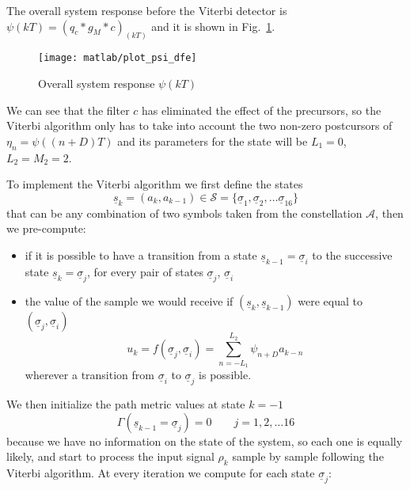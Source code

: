 \documentclass[a4paper,oneside]{article}
\renewcommand{\vec}[1]{\underline{#1}}
\newcommand{\vsigma}[0]{\vec{\sigma}}
\begin{document}
The overall system response before the Viterbi detector is $\psi(kT) =
(q_c * g_M * c)_{(kT)}$ and it is shown in Fig.~\ref{plot:psi_dfe}.
\begin{figure}[htbp]
  \centering
  \texttt{[image: matlab/plot\_psi\_dfe]}
  \caption{Overall system response $\psi(kT)$}
  \label{plot:psi_dfe}
\end{figure}
We can see that the filter $c$ has eliminated the effect of the
precursors, so the Viterbi algorithm only has to take into account the
two non-zero postcursors of $\eta_n = \psi((n+D)T)$ and its parameters
for the state will be $L_1 = 0$, $L_2 = M_2 = 2$.

To implement the Viterbi algorithm we first define the states
\begin{equation}
  \vec{s}_k = (a_k,a_{k-1}) \in \mathcal{S} = \{ \vec{\sigma}_1, \vec{\sigma}_2, \dots \vec{\sigma}_{16} \}
\end{equation}
that can be any combination of two symbols taken from the
constellation $\mathcal{A}$, then we pre-compute:
\begin{itemize}
  \item if it is possible to have a transition from a state
    $\vec{s}_{k-1} = \vec{\sigma}_i$ to the successive state
    $\vec{s}_{k} = \vec{\sigma}_j$, for every pair of states
    $\vec{\sigma}_j$, $\vec{\sigma}_i$    
\item the value of the sample we would receive if
  $(\vec{s}_k,\vec{s}_{k-1})$ were equal to $(\vsigma_j, \vsigma_i)$
  \begin{equation}
    u_k = f(\vec{\sigma}_j, \vec{\sigma}_i) =
    \sum_{n=-L_1}^{L_2}\psi_{n+D}a_{k-n}
  \end{equation} wherever a transition from $\vec{\sigma}_i$ to $\vec{\sigma}_j$ is
  possible.
\end{itemize}
We then initialize the path metric values at state $k=-1$
\begin{equation}
  \Gamma(\vec{s}_{k-1} = \vec{\sigma}_j) = 0 \qquad j=1,2,\dots16
\end{equation}
because we have no information on the state of the system, so each one
is equally likely, and start to process the input signal $\rho_k$
sample by sample following the Viterbi algorithm. At every iteration
we compute for each state $\vsigma_j$:
\end{document}
